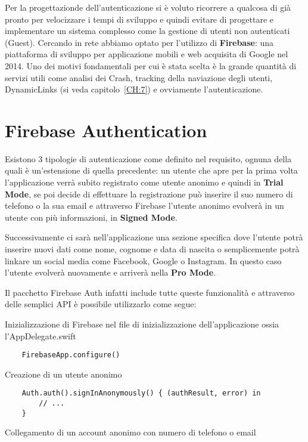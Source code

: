 
Per la progettazionde dell'autenticazione si è voluto ricorrere a qualcosa di 
già pronto per velocizzare i tempi di sviluppo e quindi evitare di progettare e implementare un sistema 
complesso come la gestione di utenti non autenticati (Guest).
Cercando in rete abbiamo optato per l'utilizzo di \textbf{Firebase}\cite{firebase}: una piattaforma
di sviluppo per applicazione mobili e web acquisita di Google nel 2014. 
Uno dei motivi fondamentali per cui è stata scelta è la grande quantità di servizi utili come
analisi dei Crash, tracking della naviazione degli utenti, DynamicLinks (si veda capitolo~\ref{CH:7})
e ovviamente l'autenticazione.

\section{Firebase Authentication}

Esistono 3 tipologie di autenticazione come definito nel requisito, ognuna della quali è un'estensione
di quella precedente: un utente che apre per la prima volta l'applicazione verrà subito registrato 
come utente anonimo e quindi in \textbf{Trial Mode}, se poi decide di effettuare la registrazione può inserire 
il suo numero di telefono o la sua email e attraverso Firebase l'utente anonimo evolverà in un utente con più
informazioni, in \textbf{Signed Mode}.

Successivamente ci sarà nell'applicazione una sezione specifica dove l'utente potrà inserire nuovi dati come nome, cognome e data di nascita
o semplicemente potrà linkare un social media come Facebook, Google o Instagram. In questo caso l'utente evolverà nuovamente 
e arriverà nella \textbf{Pro Mode}.

Il pacchetto Firebase Auth infatti include tutte queste funzionalità e attraverso delle semplici API
è possibile utilizzarlo come segue:

Inizializzazione di Firebase nel file di inizializzazione dell'applicazione ossia l'AppDelegate.swift

\begin{verbatim}
    FirebaseApp.configure()
\end{verbatim}

Creazione di un utente anonimo

\begin{verbatim}
    Auth.auth().signInAnonymously() { (authResult, error) in
        // ...
    }
\end{verbatim}

Collegamento di un account anonimo con numero di telefono o email

